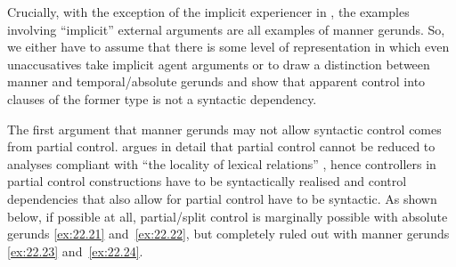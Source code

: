 \documentclass[output=paper]{langsci/langscibook}
\begin{document}
Crucially, with the exception of the implicit experiencer in ,
the examples involving “implicit” external arguments are all examples of manner
gerunds.  So, we either have to assume that there is some level of
representation in which even unaccusatives take implicit agent arguments or to
draw a distinction between manner and temporal/absolute gerunds and show that
apparent control into clauses of the former type is not a syntactic dependency.

\hspace*{-0.98575pt}The first argument that manner gerunds may not allow syntactic control comes
from partial control. \citet{Landau2010} argues in detail that partial control
cannot be reduced to analyses compliant with “the locality of lexical
relations” \citep[361]{Landau2010}, hence controllers in partial
control constructions
have to be syntactically realised and control dependencies that also allow for
partial control have to be syntactic. As shown below, if possible at all,
partial/split control is marginally possible with absolute gerunds
\eqref{ex:22.21} and~\eqref{ex:22.22}, but completely ruled out with
manner gerunds \eqref{ex:22.23} and~\eqref{ex:22.24}.
\end{document}
